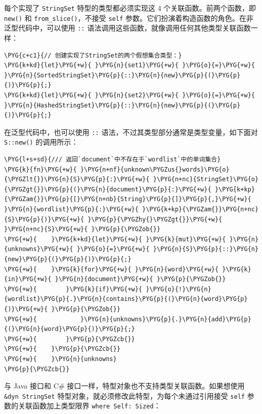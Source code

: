 每个实现了 \texttt{StringSet} 特型的类型都必须实现这 4 个关联函数。前两个函数，即 \texttt{new()} 和 \texttt{from\_slice()}，不接受 \texttt{self} 参数。它们扮演着构造函数的角色。在非泛型代码中，可以使用 \texttt{::} 语法调用这些函数，就像调用任何其他类型关联函数一样：

\begin{Verbatim}[commandchars=\\\{\},breaklines=true,breakanywhere=true,fontsize=\codefont,xleftmargin=17bp]
\PYG{c+c1}{// 创建实现了StringSet的两个假想集合类型：}
\PYG{k+kd}{let}\PYG{+w}{ }\PYG{n}{set1}\PYG{+w}{ }\PYG{o}{=}\PYG{+w}{ }\PYG{n}{SortedStringSet}\PYG{p}{::}\PYG{n}{new}\PYG{p}{(}\PYG{p}{)}\PYG{p}{;}
\PYG{k+kd}{let}\PYG{+w}{ }\PYG{n}{set2}\PYG{+w}{ }\PYG{o}{=}\PYG{+w}{ }\PYG{n}{HashedStringSet}\PYG{p}{::}\PYG{n}{new}\PYG{p}{(}\PYG{p}{)}\PYG{p}{;}
\end{Verbatim}

在泛型代码中，也可以使用 \texttt{::} 语法，不过其类型部分通常是类型变量，如下面对 \texttt{S::new()} 的调用所示：

\begin{Verbatim}[commandchars=\\\{\},breaklines=true,breakanywhere=true,fontsize=\codefont,xleftmargin=17bp]
\PYG{l+s+sd}{/// 返回`document`中不存在于`wordlist`中的单词集合}
\PYG{k}{fn}\PYG{+w}{ }\PYG{n+nf}{unknown\PYGZus{}words}\PYG{o}{\PYGZlt{}}\PYG{n}{S}\PYG{p}{:}\PYG{+w}{ }\PYG{n+nc}{StringSet}\PYG{o}{\PYGZgt{}}\PYG{p}{(}\PYG{n}{document}\PYG{p}{:}\PYG{+w}{ }\PYG{k+kp}{\PYGZam{}}\PYG{p}{[}\PYG{n+nb}{String}\PYG{p}{]}\PYG{p}{,}\PYG{+w}{ }\PYG{n}{wordlist}\PYG{p}{:}\PYG{+w}{ }\PYG{k+kp}{\PYGZam{}}\PYG{n+nc}{S}\PYG{p}{)}\PYG{+w}{ }\PYG{p}{\PYGZhy{}\PYGZgt{}}\PYG{+w}{ }\PYG{n+nc}{S}\PYG{+w}{ }\PYG{p}{\PYGZob{}}
\PYG{+w}{    }\PYG{k+kd}{let}\PYG{+w}{ }\PYG{k}{mut}\PYG{+w}{ }\PYG{n}{unknowns}\PYG{+w}{ }\PYG{o}{=}\PYG{+w}{ }\PYG{n}{S}\PYG{p}{::}\PYG{n}{new}\PYG{p}{(}\PYG{p}{)}\PYG{p}{;}
\PYG{+w}{    }\PYG{k}{for}\PYG{+w}{ }\PYG{n}{word}\PYG{+w}{ }\PYG{k}{in}\PYG{+w}{ }\PYG{n}{document}\PYG{+w}{ }\PYG{p}{\PYGZob{}}
\PYG{+w}{        }\PYG{k}{if}\PYG{+w}{ }\PYG{o}{!}\PYG{n}{wordlist}\PYG{p}{.}\PYG{n}{contains}\PYG{p}{(}\PYG{n}{word}\PYG{p}{)}\PYG{+w}{ }\PYG{p}{\PYGZob{}}
\PYG{+w}{            }\PYG{n}{unknowns}\PYG{p}{.}\PYG{n}{add}\PYG{p}{(}\PYG{n}{word}\PYG{p}{)}\PYG{p}{;}
\PYG{+w}{        }\PYG{p}{\PYGZcb{}}
\PYG{+w}{    }\PYG{p}{\PYGZcb{}}
\PYG{+w}{    }\PYG{n}{unknowns}
\PYG{p}{\PYGZcb{}}
\end{Verbatim}

与 Java 接口和 C\# 接口一样，特型对象也不支持类型关联函数。如果想使用 \texttt{\&dyn StringSet} 特型对象，就必须修改此特型，为每个未通过引用接受 \texttt{self} 参数的关联函数加上类型限界 \texttt{where Self: Sized}：

